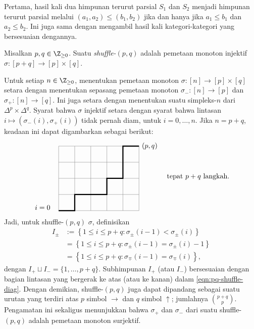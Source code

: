 Pertama, hasil kali dua himpunan terurut parsial $S_1$ dan $S_2$ menjadi
himpunan terurut parsial melalui
$(a_1,a_2)\leq(b_1,b_2)$ jika dan hanya jika
$a_1\leq b_1$ dan $a_2\leq b_2$. Ini juga sama dengan mengambil hasil kali
kategori-kategori yang bersesuaian dengannya.

\begin{definition}\label{def:pq-shuffle}
	Misalkan $p,q\in\Z_{\geq0}$. Suatu \emph{shuffle-$(p,q)$} adalah pemetaan
	monoton injektif $\sigma:[p+q]\to[p]\times[q]$.
\end{definition}

Untuk setiap $n\in\Z_{\geq0}$, menentukan pemetaan monoton
$\sigma:[n]\to[p]\times[q]$ setara dengan menentukan sepasang pemetaan
monoton $\sigma_-:[n]\to[p]$ dan $\sigma_+:[n]\to[q]$. Ini juga setara
dengan menentukan suatu simpleks-$n$ dari $\Delta^p\times\Delta^q$.
Syarat bahwa $\sigma$ injektif setara dengan syarat bahwa lintasan
$i\mapsto(\sigma_-(i),\sigma_+(i))$ tidak pernah diam, untuk
$i=0,\ldots,n$. Jika $n=p+q$, keadaan ini dapat digambarkan sebagai berikut:
\begin{equation}\label{eqn:pq-shuffle-diag}
	\begin{tikzpicture}[scale=0.8, baseline=(O)]
		\draw[thin, gray] (0, 0) grid (5, 4);
		\node at (-1, 0.2) {$i=0$};
		\draw[ultra thick] (0, 0) -- (1, 0) -- (1, 1) -- (2, 1) -- (3, 1) -- (3, 2) -- (4, 2) -- (4, 3) -- (4, 4) -- (5, 4) node[right] {$(p, q)$};
		\coordinate (O) at (0, 2);
	\end{tikzpicture}
	\quad
	\text{tepat $p+q$ langkah.}
\end{equation}
Jadi, untuk shuffle-$(p,q)$ $\sigma$, definisikan
\begin{align*}
	I_\pm & := \left\{ 1 \leq i \leq p+q : \sigma_\pm(i-1) < \sigma_\pm(i) \right\} \\
	& = \left\{ 1 \leq i \leq p+q : \sigma_\pm(i-1) = \sigma_\pm(i) - 1 \right\} \\
	& = \left\{ 1 \leq i \leq p+q: \sigma_\mp(i-1) = \sigma_\mp(i) \right\},
\end{align*}
dengan $I_+\sqcup I_-=\{1,\ldots,p+q\}$. Subhimpunan $I_+$ (atau $I_-$)
bersesuaian dengan bagian lintasan yang bergerak ke atas (atau ke kanan)
dalam \eqref{eqn:pq-shuffle-diag}. Dengan demikian, shuffle-$(p,q)$ juga
dapat dipandang sebagai suatu urutan yang terdiri atas $p$ simbol
$\rightarrow$ dan $q$ simbol $\uparrow$; jumlahnya
$\binom{p+q}{p}$. Pengamatan ini sekaligus menunjukkan bahwa $\sigma_+$ dan
$\sigma_-$ dari suatu shuffle-$(p,q)$ adalah pemetaan monoton surjektif.

